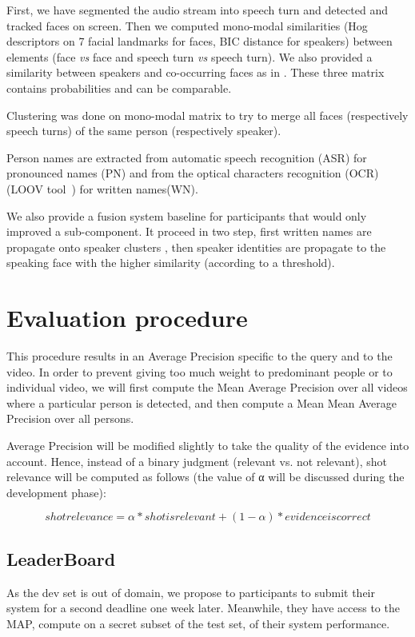 \documentclass{acm_proc_article-me}
\begin{document}
First, we have segmented the audio stream into speech turn and detected and tracked faces on screen. Then we computed mono-modal similarities (Hog descriptors on 7 facial landmarks for faces, BIC distance for speakers) between elements (face \emph{vs} face and speech turn \emph{vs} speech turn). We also provided a similarity between speakers and co-occurring faces as in \cite{POIGNANT--MTAP--2015}. These three matrix contains probabilities and can be comparable.

Clustering was done on mono-modal matrix to try to merge all faces (respectively speech turns) of the same person (respectively speaker). 

Person names are extracted from automatic speech recognition (ASR) for pronounced names (PN) and from the optical characters recognition (OCR) (LOOV tool~\cite{POIGNANT--ICME--2012}) for written names(WN).

We also provide a fusion system baseline for participants that would only improved a sub-component. It proceed in two step, first written names are propagate onto speaker clusters \cite{POIGNANT--INTERSPEECH--2012}, then speaker identities are propagate to the speaking face with the higher similarity (according to a threshold).

\section{Evaluation procedure}

This procedure results in an Average Precision specific to the query and to the video. In order to prevent giving too much weight to predominant people or to individual video, we will first compute the Mean Average Precision over all videos where a particular person is detected, and then compute a Mean Mean Average Precision over all persons.

Average Precision will be modified slightly to take the quality of the evidence into account. Hence, instead of a binary judgment (relevant vs. not relevant), shot relevance will be computed as follows (the value of α will be discussed during the development phase):

$$ shot relevance = \alpha * shot is relevant + (1 - \alpha) * evidence is correct $$


\subsection{LeaderBoard}

As the dev set is out of domain, we propose to participants to submit their system for a second deadline one week later. Meanwhile, they have access to the MAP, compute on a secret subset of the test set, of their system performance. 
\end{document}
